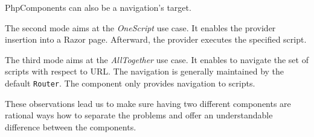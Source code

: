 PhpComponents can also be a navigation's target.
\par
The second mode aims at the \textit{OneScript} use case.
It enables the provider insertion into a Razor page.
Afterward, the provider executes the specified script.
\par
The third mode aims at the \textit{AllTogether} use case.
It enables to navigate the set of scripts with respect to URL.
The navigation is generally maintained by the default \texttt{Router}.
The component only provides navigation to scripts.
\par
These observations lead us to make sure having two different components are rational ways how to separate the problems and offer an understandable difference between the components.


